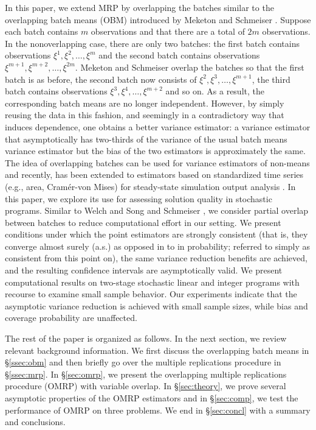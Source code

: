 \documentclass{article}
\newcommand{\xit}{\xi}  %
\begin{document}
In this paper, we extend MRP by overlapping the batches similar to the overlapping batch means (OBM) introduced by Meketon and Schmeiser \cite{Meketon1984}. 
Suppose each batch contains $m$ observations and that there are a total of $2m$ observations.  
In the nonoverlapping case, there are only two batches: the first batch contains observations $\xit^1, \xit^2, \dots, \xit^m$ and the second batch contains observations $\xit^{m+1}, \xit^{m+2}, \dots, \xit^{2m}$.   
Meketon and Schmeiser \cite{Meketon1984} overlap the batches so that the first batch is as before, the second batch now consists of $\xit^2, \xit^3, \dots, \xit^{m+1}$, the third batch contains observations $\xit^3, \xit^4, \dots, \xit^{m+2}$ and so on. 
As a result, the corresponding batch means are no longer independent. 
However, by simply reusing the data in this fashion, and seemingly in a contradictory way that induces dependence, one obtains a better variance estimator: a variance estimator that asymptotically has two-thirds of the variance of the usual batch means variance estimator but the bias of the two estimators is approximately the same.  
The idea of overlapping batches can be used for variance estimators of non-means \cite{SAH90} and recently, has been extended to estimators based on standardized time series (e.g., area, Cram\'{e}r-von Mises) for steady-state simulation output analysis \cite{Alexopoulos01012007,Alexopoulos2007}. 
In this paper, we explore its use for assessing solution quality in stochastic programs.  
Similar to Welch \cite{Welch1987} and Song and Schmeiser \cite{Song1992}, we consider partial overlap between batches to reduce computational effort in our setting. 
We present conditions under which the point estimators are strongly consistent (that is, they converge almost surely (a.s.) as opposed in to in probability; referred to simply as consistent from this point on), the same variance reduction benefits are achieved, and the resulting confidence intervals are asymptotically valid.  
We present computational results on two-stage stochastic linear and integer programs with recourse to examine small sample behavior.  
Our experiments indicate that the asymptotic variance reduction is achieved with small sample sizes, while bias and coverage probability are unaffected.

The rest of the paper is organized as follows.  
In the next section, we review relevant background information.  
We first discuss the overlapping batch means in \S \ref{ssec:obm} and then briefly go over the multiple replications procedure in \S \ref{ssec:mrp}.  
In \S \ref{sec:omrp}, we present the overlapping multiple replications procedure (OMRP) with variable overlap.  
In \S \ref{sec:theory}, we prove several asymptotic properties of the OMRP estimators and in \S \ref{sec:comp}, we test the performance of OMRP on three problems.  
We end in \S \ref{sec:concl} with a summary and conclusions.
\end{document}
